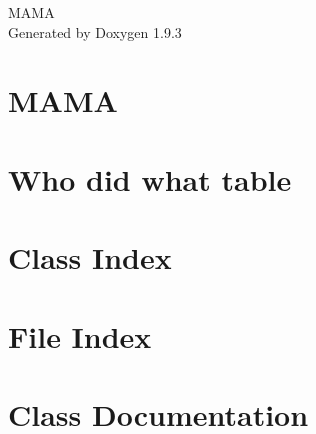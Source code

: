 \documentclass[twoside]{book}
\newcommand{\+}{\discretionary{\mbox{\scriptsize$\hookleftarrow$}}{}{}}
\newcommand{\clearemptydoublepage}{%
    \newpage{\pagestyle{empty}\cleardoublepage}%
  }
\begin{document}
  \raggedbottom
    \hypersetup{pageanchor=false,
                bookmarksnumbered=true,
                pdfencoding=unicode
               }
  \begin{titlepage}
  \vspace*{7cm}
  \begin{center}%
  {\Large MAMA}\\
  \vspace*{1cm}
  {\large Generated by Doxygen 1.9.3}\\
  \end{center}
  \end{titlepage}
  \clearemptydoublepage
  \tableofcontents
  \clearemptydoublepage
  \hypersetup{pageanchor=true}
\chapter{MAMA}
\label{md__home_maximillian_Desktop_MAMA_README}

\chapter{Who did what table}
\label{md__home_maximillian_Desktop_MAMA_WhoDidWhat}

\chapter{Class Index}

\chapter{File Index}

\chapter{Class Documentation}



















\end{document}
